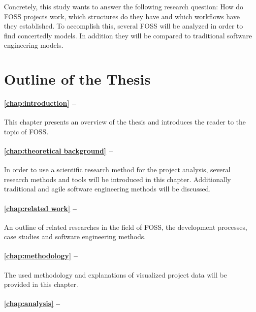 Concretely, this study wants to answer the following research
question: How do \ac{FOSS} projects work, which structures do they have and
which workflows have they established. To accomplish this, several \ac{FOSS}
will be analyzed in order to find concertedly models. In addition they will be
compared to traditional software engineering models.


\section{Outline of the Thesis} %

\paragraph{\autoref{chap:introduction} -- }

This chapter presents an overview of the thesis and introduces the reader to
the topic of \ac{FOSS}.

\paragraph{\autoref{chap:theoretical background} -- }

In order to use a scientific research method for the project analysis, several
research methods and tools will be introduced in this chapter. Additionally
traditional and agile software engineering methods will be discussed.

\paragraph{\autoref{chap:related work} -- }

An outline of related researches in the field of \ac{FOSS}, the
development processes, case studies and software engineering methods.

\paragraph{\autoref{chap:methodology} -- }

The used methodology and explanations of visualized project data will be
provided in this chapter.

\paragraph{\autoref{chap:analysis} -- }

